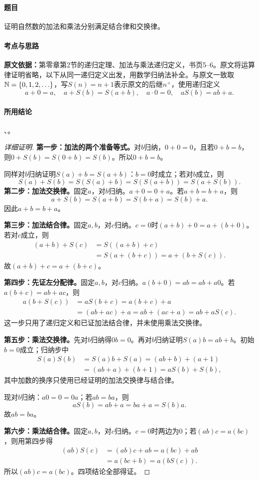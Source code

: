 \paragraph{题目}证明自然数的加法和乘法分别满足结合律和交换律。
\paragraph{考点与思路}\textbf{原文依据：}第零章第2节的递归定理、加法与乘法递归定义，书页5--6。原文将运算律证明省略，以下从同一递归定义出发，用数学归纳法补全。与原文一致取$\mathbb N=\{0,1,2,\ldots\}$，写$S(n)=n+1$表示原文的后继$n^+$，使用递归定义
\[
a+0=a,\quad a+S(b)=S(a+b),\quad a\cdot0=0,\quad aS(b)=ab+a.
\]
\paragraph{所用结论}、。
\begin{proof}[详细证明]
\textbf{第一步：加法的两个准备等式。}对$b$归纳，$0+0=0$，且若$0+b=b$，则$0+S(b)=S(0+b)=S(b)$。所以$0+b=b$。

同样对$b$归纳证明$S(a)+b=S(a+b)$：$b=0$时成立；若对$b$成立，则
\[
S(a)+S(b)=S(S(a)+b)=S(S(a+b))=S(a+S(b)).
\]
\textbf{第二步：加法交换律。}固定$a$，对$b$归纳。$a+0=0+a$。若$a+b=b+a$，则
\[
a+S(b)=S(a+b)=S(b+a)=S(b)+a.
\]
因此$a+b=b+a$。

\textbf{第三步：加法结合律。}固定$a,b$，对$c$归纳。$c=0$时$(a+b)+0=a+(b+0)$。若对$c$成立，则
\begin{align*}
(a+b)+S(c)&=S((a+b)+c)\\
&=S(a+(b+c))=a+(b+S(c)).
\end{align*}
故$(a+b)+c=a+(b+c)$。

\textbf{第四步：先证左分配律。}固定$a,b$，对$c$归纳。$a(b+0)=ab=ab+a0$。若$a(b+c)=ab+ac$，则
\begin{align*}
a(b+S(c))&=aS(b+c)=a(b+c)+a\\
&=(ab+ac)+a=ab+(ac+a)=ab+aS(c).
\end{align*}
这一步只用了递归定义和已证加法结合律，并未使用乘法交换律。

\textbf{第五步：乘法交换律。}先对$b$归纳得$0b=0$。再对$b$归纳证明$S(a)b=ab+b$。初始$b=0$成立；归纳步中
\begin{align*}
S(a)S(b)&=S(a)b+S(a)=(ab+b)+(a+1)\\
&=(ab+a)+(b+1)=aS(b)+S(b),
\end{align*}
其中加数的换序只使用已经证明的加法交换律与结合律。

现对$b$归纳：$a0=0=0a$；若$ab=ba$，则
\[
aS(b)=ab+a=ba+a=S(b)a.
\]
故$ab=ba$。

\textbf{第六步：乘法结合律。}固定$a,b$，对$c$归纳。$c=0$时两边为$0$；若$(ab)c=a(bc)$，则用第四步得
\begin{align*}
(ab)S(c)&=(ab)c+ab=a(bc)+ab\\
&=a(bc+b)=a(bS(c)).
\end{align*}
所以$(ab)c=a(bc)$。四项结论全部得证。
\end{proof}
